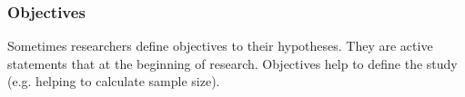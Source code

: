 \subsubsection{Objectives}

Sometimes researchers define objectives to their hypotheses. They are active statements that  \cite[p. 280]{Farrugia2009} at the beginning of research. Objectives help to define the study (e.g. helping to calculate sample size). \cite{Farrugia2009,Vickers} 